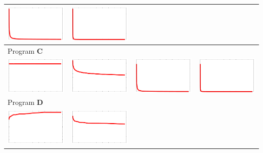\documentclass[a4paper]{article}
\begin{document}
\begin{center}
\begin{tabular}{cccc}
    \includegraphics[width=0.23\columnwidth]{flog1-n.pdf} &
    \includegraphics[width=0.23\columnwidth]{flog1-n2.pdf} \\
    \midrule
    \multicolumn{4}{l}{Program \textbf{C}} \\
    \quad
    \includegraphics[width=0.23\columnwidth]{fconst.pdf} &
    \includegraphics[width=0.23\columnwidth]{fconst-log.pdf} &
    \includegraphics[width=0.23\columnwidth]{fconst-n.pdf} &
    \includegraphics[width=0.23\columnwidth]{fconst-n2.pdf} \\
    \midrule
    \multicolumn{4}{l}{Program \textbf{D}} \\
    \quad
    \includegraphics[width=0.23\columnwidth]{flog2.pdf} &
    \includegraphics[width=0.23\columnwidth]{flog2-log.pdf} &

\end{tabular}
\end{center}
\end{document}

